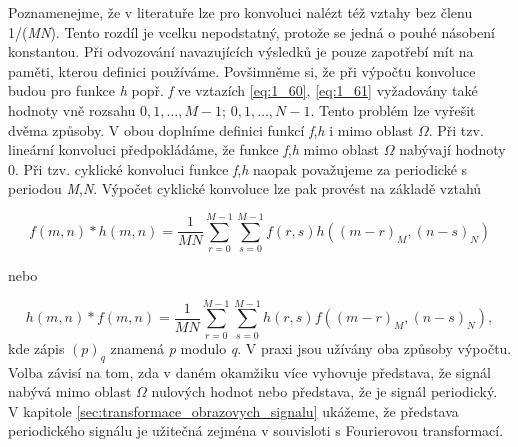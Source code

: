 Poznamenejme, že v literatuře lze pro konvoluci nalézt též vztahy bez členu 1/(\textit{MN}). Tento rozdíl je vcelku nepodstatný, protože se jedná o pouhé násobení konstantou. Při odvozování navazujících výsledků je pouze zapotřebí mít na paměti, kterou definici používáme. Povšimněme si, že při výpočtu konvoluce budou pro funkce \textit{h} popř. \textit{f}  ve vztazích \eqref{eq:1_60}, \eqref{eq:1_61} vyžadovány také hodnoty vně rozsahu $0, 1, \dots, M-1$; $0, 1, \dots, N-1$. Tento problém lze vyřešit dvěma způsoby. V obou doplníme definici funkcí \textit{f},\textit{h} i mimo oblast $\Omega$. Při tzv. lineární konvoluci předpokládáme, že funkce \textit{f},\textit{h} mimo oblast $\Omega$ nabývají hodnoty 0. Při tzv. cyklické konvoluci funkce \textit{f},\textit{h} naopak považujeme za periodické s periodou \textit{M},\textit{N}. Výpočet cyklické konvoluce lze pak provést na základě vztahů

\begin{equation} \label{eq:1_62}
    f(m, n) \ast h(m, n) = \frac{1}{MN} \sum\limits_{r=0}^{M-1} \sum\limits_{s=0}^{M-1} f(r, s) h\left( \left( m - r \right)_M, \left(n - s\right)_N \right)
\end{equation}

\noindent nebo

\begin{equation} \label{eq:1_63}
    h(m, n) \ast f(m, n) = \frac{1}{MN} \sum\limits_{r=0}^{M-1} \sum\limits_{s=0}^{M-1} h(r, s) f\left( \left( m - r\right)_M, \left(n - s\right)_N \right),
\end{equation}
kde zápis $(p)_q$ znamená \textit{p} modulo \textit{q}. V praxi jsou užívány oba způsoby výpočtu. Volba závisí na tom, zda v daném okamžiku více vyhovuje představa, že signál nabývá mimo oblast $\Omega$ nulových hodnot nebo představa, že je signál periodický. V kapitole \ref{sec:transformace_obrazovych_signalu} ukážeme, že představa periodického signálu je užitečná zejména v souvisloti s Fourierovou transformací.

